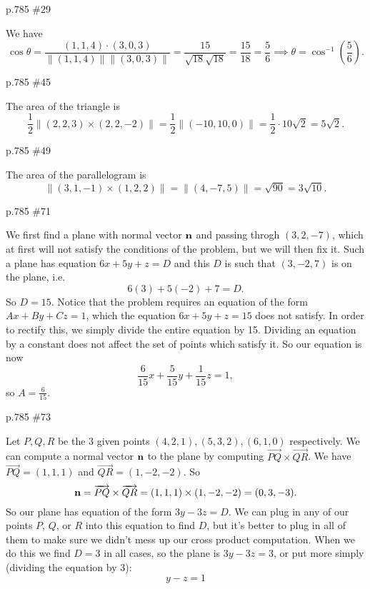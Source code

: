 \documentclass[11pt,oneside]{amsart}
\theoremstyle{definition}
\begin{document}
\begin{practice}p.785 \#29\end{practice}
\begin{pracsol}
  We have
  \[\cos\theta=\frac{(1,1,4)\cdot(3,0,3)}{\|(1,1,4)\|\|(3,0,3)\|}=\frac{15}{\sqrt{18}\sqrt{18}}=\frac{15}{18}=\frac56\implies\theta=\cos^{-1}\left(\frac56\right).\]
\end{pracsol}
\begin{practice}p.785 \#45\end{practice}
\begin{pracsol}
  The area of the triangle is
  \[\frac12\|(2,2,3)\times(2,2,-2)\|=\frac12\|(-10,10,0)\|=\frac12\cdot 10\sqrt2=5\sqrt2.\]
\end{pracsol}
\begin{practice}p.785 \#49\end{practice}
\begin{pracsol}
  The area of the parallelogram is
  \[\|(3,1,-1)\times(1,2,2)\|=\|(4,-7,5)\|=\sqrt{90}=3\sqrt{10}.\]
\end{pracsol}
\begin{practice}p.785 \#71\end{practice}
\begin{pracsol}
  We first find a plane with normal vector $\mathbf n$ and passing throgh $(3,2,-7)$, which at first will not satisfy the conditions of the problem, but we will then fix it. Such a plane has equation $6x+5y+z=D$ and this $D$ is such that $(3,-2,7)$ is on the plane, i.e.\
  \[6(3)+5(-2)+7=D.\]
  So $D=15$. Notice that the problem requires an equation of the form $Ax+By+Cz=1$, which the equation $6x+5y+z=15$ does not satisfy. In order to rectify this, we simply divide the entire equation by 15. Dividing an equation by a constant does not affect the set of points which satisfy it. So our equation is now
  \[\frac 6{15}x+\frac5{15}y+\frac1{15}z=1,\]
  so $A=\frac6{15}$.
\end{pracsol}
\begin{practice}p.785 \#73\end{practice}
\begin{pracsol}
  Let $P,Q,R$ be the 3 given points $(4,2,1),(5,3,2),(6,1,0)$ respectively. We can compute a normal vector $\mathbf n$ to the plane by computing $\overrightarrow{PQ}\times\overrightarrow{QR}$. We have $\overrightarrow{PQ}=(1,1,1)$ and $\overrightarrow{QR}=(1,-2,-2)$. So
  \[\mathbf n=\overrightarrow{PQ}\times\overrightarrow{QR}=(1,1,1)\times(1,-2,-2)=(0,3,-3).\]
  So our plane has equation of the form $3y-3z=D$. We can plug in any of our points $P$, $Q$, or $R$ into this equation to find $D$, but it's better to plug in all of them to make sure we didn't mess up our cross product computation. When we do this we find $D=3$ in all cases, so the plane is $3y-3z=3$, or put more simply (dividing the equation by 3):
  \[y-z=1\]
\end{pracsol}
\end{document}
